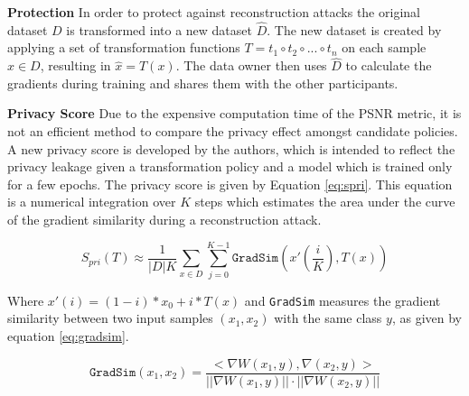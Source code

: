 \textbf{Protection}
In order to protect against reconstruction attacks the original dataset $D$ is transformed into a new dataset $\hat{D}$. The new dataset is created by applying a set of transformation functions $T = t_1 \circ t_2 \circ ... \circ t_n$ on each sample $x \in D$, resulting in $\hat{x} = T(x)$. The data owner then uses $\hat{D}$ to calculate the gradients during training and shares them with the other participants.

\textbf{Privacy Score} Due to the expensive computation time of the PSNR metric, it is not an efficient method to compare the privacy effect amongst candidate policies. A new privacy score is developed by the authors, which is intended to reflect the privacy leakage given a transformation policy and a model which is trained only for a few epochs. The privacy score is given by Equation \ref{eq:spri}. This equation is a numerical integration over $K$ steps which estimates the area under the curve of the gradient similarity during a reconstruction attack.

\begin{equation}\label{eq:spri}
    S_{pri} (T) \approx \frac{1}{|D| K} \sum_{x\in D}\sum_{j=0}^{K-1} \texttt{GradSim} (x'(\frac{i}K),T(x))
\end{equation}


Where $x'(i) = (1 - i) * x_0 + i * T(x)$ and \texttt{GradSim} measures the gradient similarity between two input samples $(x_1, x_2)$ with the same class $y$, as given by equation \ref{eq:gradsim}.

\begin{equation}\label{eq:gradsim}
    \texttt{GradSim}(x_1,x_2) = \frac{<\nabla W(x_1, y), \nabla (x_2, y)>}{|| \nabla W(x_1,y)|| \cdot ||\nabla W(x_2,y)||}
\end{equation}


